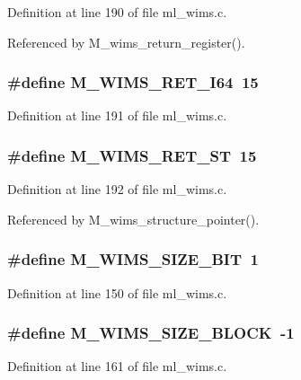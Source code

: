 Definition at line 190 of file ml\_\-wims.c.

Referenced by M\_\-wims\_\-return\_\-register().
\subsubsection{\setlength{\rightskip}{0pt plus 5cm}\#define M\_\-WIMS\_\-RET\_\-I64~15}\label{ml__wims_8c_894b8c718d8265f7cbd5c3f850a43130}




Definition at line 191 of file ml\_\-wims.c.
\subsubsection{\setlength{\rightskip}{0pt plus 5cm}\#define M\_\-WIMS\_\-RET\_\-ST~15}\label{ml__wims_8c_ab4053683c4cdc0b63c5da2f0312ce87}




Definition at line 192 of file ml\_\-wims.c.

Referenced by M\_\-wims\_\-structure\_\-pointer().
\subsubsection{\setlength{\rightskip}{0pt plus 5cm}\#define M\_\-WIMS\_\-SIZE\_\-BIT~1}\label{ml__wims_8c_8dbe9284cda1ce15e904db2b2b0c70cd}




Definition at line 150 of file ml\_\-wims.c.
\subsubsection{\setlength{\rightskip}{0pt plus 5cm}\#define M\_\-WIMS\_\-SIZE\_\-BLOCK~-1}\label{ml__wims_8c_ca0ee342385e52791a63efa23deccd71}




Definition at line 161 of file ml\_\-wims.c.
